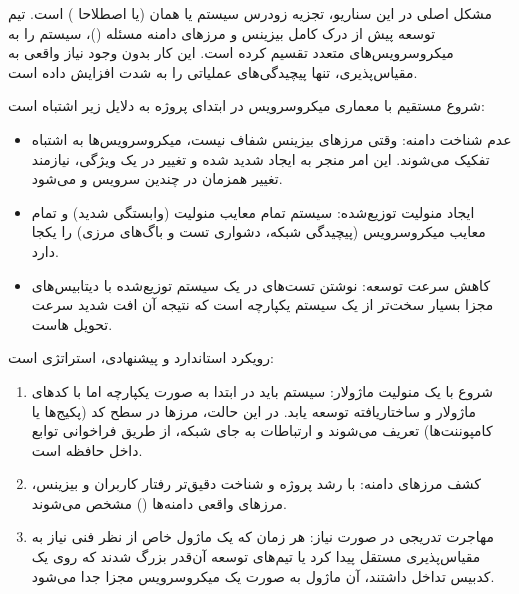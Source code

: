 مشکل اصلی در این سناریو، {تجزیه زودرس سیستم} یا همان  (یا اصطلاحا ) است. تیم توسعه پیش از درک کامل بیزینس و مرزهای دامنه مسئله ()، سیستم را به میکروسرویس‌های متعدد تقسیم کرده است. این کار بدون وجود نیاز واقعی به مقیاس‌پذیری، تنها پیچیدگی‌های عملیاتی را به شدت افزایش داده است.

شروع مستقیم با معماری میکروسرویس در ابتدای پروژه به دلایل زیر اشتباه است:
\begin{itemize}
    \item {عدم شناخت دامنه:} وقتی مرزهای بیزینس شفاف نیست، میکروسرویس‌ها به اشتباه تفکیک می‌شوند. این امر منجر به ایجاد  شدید شده و تغییر در یک ویژگی، نیازمند تغییر همزمان در چندین سرویس و  می‌شود.
    \item {ایجاد منولیت توزیع‌شده:} سیستم تمام معایب منولیت (وابستگی شدید) و تمام معایب میکروسرویس (پیچیدگی شبکه، دشواری تست و باگ‌های مرزی) را یکجا دارد.
    \item {کاهش سرعت توسعه:} نوشتن تست‌های  در یک سیستم توزیع‌شده با دیتابیس‌های مجزا بسیار سخت‌تر از یک سیستم یکپارچه است که نتیجه آن افت شدید سرعت تحویل هاست.
\end{itemize}

رویکرد استاندارد و پیشنهادی، استراتژی {} است:
\begin{enumerate}
    \item {شروع با یک منولیت ماژولار:} سیستم باید در ابتدا به صورت یکپارچه اما با کدهای ماژولار و ساختاریافته توسعه یابد. در این حالت، مرزها در سطح کد (پکیج‌ها یا کامپوننت‌ها) تعریف می‌شوند و ارتباطات به جای شبکه، از طریق فراخوانی توابع داخل حافظه است.
    \item {کشف مرزهای دامنه:} با رشد پروژه و شناخت دقیق‌تر رفتار کاربران و بیزینس، مرزهای واقعی دامنه‌ها () مشخص می‌شوند.
    \item {مهاجرت تدریجی در صورت نیاز:} هر زمان که یک ماژول خاص از نظر فنی نیاز به مقیاس‌پذیری مستقل پیدا کرد یا تیم‌های توسعه آن‌قدر بزرگ شدند که روی یک کدبیس تداخل داشتند، آن ماژول به صورت یک میکروسرویس مجزا جدا می‌شود.
\end{enumerate}
